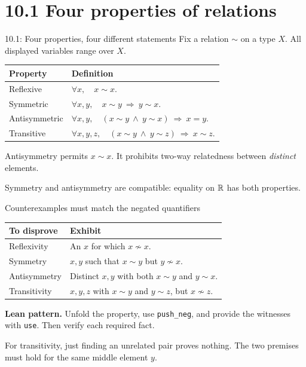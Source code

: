 \section{10.1 Four properties of relations}
\begin{frame}{10.1: Four properties, four different statements}
Fix a relation $\sim$ on a type $X$. All displayed variables range over $X$.
\begin{center}
\begin{tabular}{lp{}}
\toprule
Property & Definition\\\midrule
Reflexive & $\forall x,\quad x\sim x$.\\[5pt]
Symmetric & $\forall x,y,\quad x\sim y\ \Longrightarrow\ y\sim x$.\\[5pt]
Antisymmetric & $\forall x,y,\quad (x\sim y\ \land\ y\sim x)\ \Longrightarrow\ x=y$.\\[5pt]
Transitive & $\forall x,y,z,\quad (x\sim y\ \land\ y\sim z)\ \Longrightarrow\ x\sim z$.\\
\bottomrule
\end{tabular}
\end{center}
Antisymmetry permits $x\sim x$. It prohibits two-way relatedness
between \emph{distinct} elements.
\medskip

Symmetry and antisymmetry are compatible: equality on $\mathbb{R}$ has both properties.
\end{frame}

\begin{frame}{Counterexamples must match the negated quantifiers}
\begin{center}
\begin{tabular}{lp{}}
\toprule
To disprove & Exhibit\\\midrule
Reflexivity & An $x$ for which $x\not\sim x$.\\[6pt]
Symmetry & $x,y$ such that $x\sim y$ but $y\not\sim x$.\\[6pt]
Antisymmetry & Distinct $x,y$ with both $x\sim y$ and $y\sim x$.\\[6pt]
Transitivity & $x,y,z$ with $x\sim y$ and $y\sim z$, but $x\not\sim z$.\\
\bottomrule
\end{tabular}
\end{center}
\textbf{Lean pattern.} Unfold the property, use \texttt{push\_neg}, and provide the
witnesses with \texttt{use}. Then verify each required fact.
\medskip

For transitivity, just finding an unrelated pair proves nothing.
The two premises must hold for the same middle element $y$.
\end{frame}

